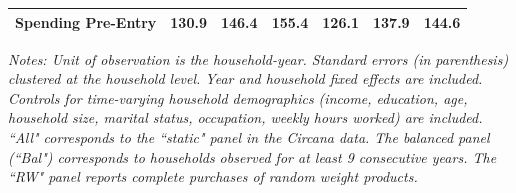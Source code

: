 {\begin{threeparttable}
\begin{tabular}{l*{6}{c}}
Spending Pre-Entry&    130.9         &    146.4         &    155.4         &    126.1         &    137.9         &    144.6         \\
\bottomrule
\end{tabular}
\begin{tablenotes}[flushleft]
\small 
\item \textit{Notes: Unit of observation is the household-year. Standard errors (in parenthesis) clustered at the household level. Year and household fixed effects are included. Controls for time-varying household demographics (income, education, age, household size, marital status, occupation, weekly hours worked) are included. ``All" corresponds to the ``static" panel in the Circana data. The balanced panel (``Bal") corresponds to households observed for at least 9 consecutive years. The ``RW" panel reports complete purchases of random weight products.}
\end{tablenotes}


\end{threeparttable}}

